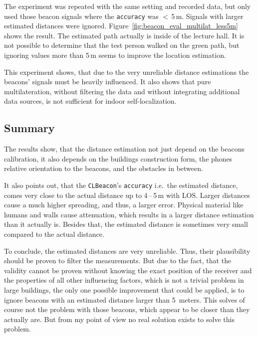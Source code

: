 The experiment was repeated with the same setting and recorded data, but only used those beacon signals where the \texttt{accuracy} was $<$\,5\,m. Signals with larger estimated distances were ignored. Figure~\ref{fig:beacon_eval_multilat_less5m} shows the result. The estimated path actually is inside of the lecture hall. It is not possible to determine that the test person walked on the green path, but ignoring values more than 5\,m seems to improve the location estimation.

This experiment shows, that due to the very unreliable distance estimations the beacons' signals must be heavily influenced. It also shows that pure multilateration, without filtering the data and without integrating additional data sources, is not sufficient for indoor self-localization.

\subsection{Summary}
The results show, that the distance estimation not just depend on the beacons calibration, it also depends on the buildings construction form, the phones relative orientation to the beacons, and the obstacles in between.

It also points out, that the \texttt{CLBeacon}'s \texttt{accuracy} i.e.\ the estimated distance, comes very close to the actual distance up to 4\,--\,5\,m with \acs{LOS}. Larger distances cause a much higher spreading, and thus, a larger error. Physical material like humans and walls cause attenuation, which results in a larger distance estimation than it actually is. Besides that, the estimated distance is sometimes very small compared to the actual distance.

To conclude, the estimated distances are very unreliable. Thus, their plausibility should be proven to filter the measurements. But due to the fact, that the validity cannot be proven without knowing the exact position of the receiver and the properties of all other influencing factors, which is not a trivial problem in large buildings, the only one possible improvement that could be applied, is to ignore beacons with an estimated distance larger than 5~meters. This solves of course not the problem with those beacons, which appear to be closer than they actually are. But from my point of view no real solution exists to solve this problem.